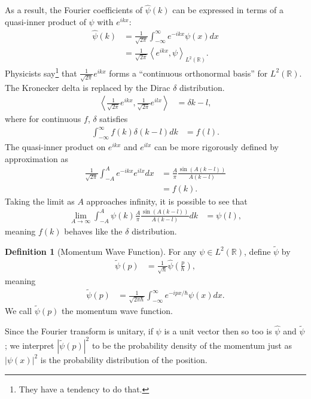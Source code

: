 \documentclass[10pt]{extarticle}
\newcommand{\R}{\mathbb{R}}
\newcommand{\iprod}[2]{\left\langle #1,#2\right\rangle}
\theoremstyle{plain}
\theoremstyle{definition}
\newtheorem*{definition}{Definition}
\theoremstyle{remark}
\renewcommand{\newline}{\hfill\break}
\begin{document}
  As a result, the Fourier coefficients of $\hat{\psi}(k)$ can be expressed in terms of a quasi-inner product of $\psi$ with $e^{ikx}$:
  \begin{align*}
    \hat{\psi}(k) &= \frac{1}{\sqrt{2\pi}}\int_{-\infty}^{\infty} e^{-ikx}\psi(x) dx\\
                  &= \frac{1}{\sqrt{2\pi}}\iprod{e^{ikx}}{\psi}_{L^{2}(\R)}.
  \end{align*}
  Physicists say\footnote{They have a tendency to do that.} that $\frac{1}{\sqrt{2\pi}}e^{ikx}$ forms a ``continuous orthonormal basis'' for $L^{2}(\R)$. The Kronecker delta is replaced by the Dirac $\delta$ distribution.
  \begin{align*}
    \iprod{\frac{1}{\sqrt{2\pi}}e^{ikx}}{\frac{1}{\sqrt{2\pi}}e^{ilx}} &= \delta{k-l},
  \end{align*}
  where for continuous $f$, $\delta$ satisfies
  \begin{align*}
    \int_{-\infty}^{\infty} f(k)\delta(k-l) dk &= f(l).
  \end{align*}
  The quasi-inner product on $e^{ikx}$ and $e^{ilx}$ can be more rigorously defined by approximation as
  \begin{align*}
    \frac{1}{\sqrt{2\pi}}\int_{-A}^{A} e^{-ikx}e^{ilx} dx &= \frac{A}{\pi}\frac{\sin\left(A(k-l)\right)}{A(k-l)}\\
                                                          &= f(k).
  \end{align*}
  Taking the limit as $A$ approaches infinity, it is possible to see that
  \begin{align*}
    \lim_{A\rightarrow\infty}\int_{-A}^{A} \psi(k)\frac{A}{\pi}\frac{\sin\left(A(k-l)\right)}{A(k-l)} dk &= \psi(l),
  \end{align*}
  meaning $f(k)$ behaves like the $\delta$ distribution.
  \begin{definition}[Momentum Wave Function]
    For any $\psi \in L^{2}(\R)$, define $\tilde{\psi}$ by
    \begin{align*}
      \tilde{\psi}(p) &= \frac{1}{\sqrt{\hbar}}\hat{\psi}\left(\frac{p}{\hbar}\right),
    \end{align*}
    meaning
    \begin{align*}
      \tilde{\psi}(p) &= \frac{1}{\sqrt{2\pi \hbar}}\int_{-\infty}^{\infty} e^{-ipx/\hbar}\psi(x) dx.
    \end{align*}
    We call $\tilde{\psi}(p)$ the momentum wave function.
  \end{definition}
  Since the Fourier transform is unitary, if $\psi$ is a unit vector then so too is $\hat{\psi}$ and $\tilde{\psi}$; we interpret $|\tilde{\psi}(p)|^2$ to be the probability density of the momentum just as $\left\vert \psi(x) \right\vert^2$ is the probability distribution of the position.\newline
\end{document}
